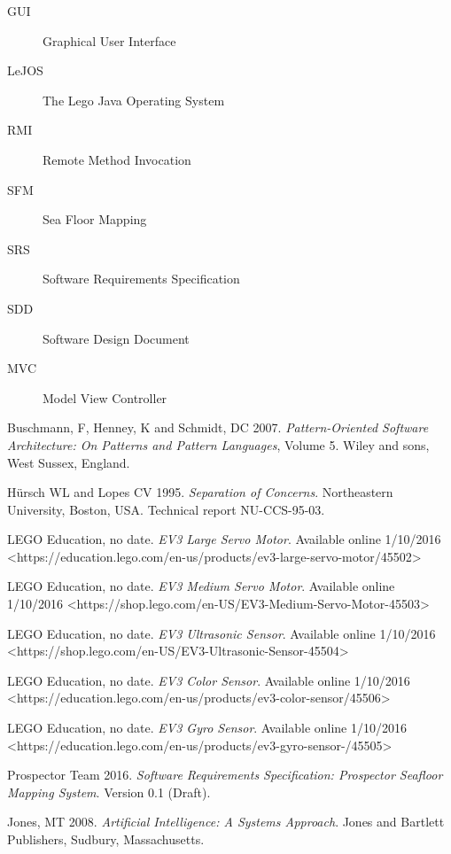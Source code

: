 \documentclass[12pt]{article}
\begin{document}
\begin{description}
\item [{GUI}] Graphical User Interface 
\item [{LeJOS}] The Lego Java Operating System 
\item [{RMI}] Remote Method Invocation 
\item [{SFM}] Sea Floor Mapping 
\item [{SRS}] Software Requirements Specification 
\item [{SDD}] Software Design Document 
\item[{MVC}] Model View Controller

\end{description}



\begin{thebibliography}{1}

 Buschmann, F, Henney, K and Schmidt, DC 2007. \textit{Pattern-Oriented Software Architecture: On Patterns and Pattern Languages}, Volume 5. Wiley and sons, West Sussex, England.

 Hürsch WL and Lopes CV 1995. \textit{Separation of Concerns}. Northeastern University, Boston, USA. Technical report NU-CCS-95-03.

 LEGO Education, no date. \textit{EV3 Large Servo Motor}. Available online 1/10/2016 <https://education.lego.com/en-us/products/ev3-large-servo-motor/45502>

 LEGO Education, no date. \textit{EV3 Medium Servo Motor}. Available online 1/10/2016 <https://shop.lego.com/en-US/EV3-Medium-Servo-Motor-45503>

 LEGO Education, no date. \textit{EV3 Ultrasonic Sensor}. Available online 1/10/2016 <https://shop.lego.com/en-US/EV3-Ultrasonic-Sensor-45504>

 LEGO Education, no date. \textit{EV3 Color Sensor}. Available online 1/10/2016 <https://education.lego.com/en-us/products/ev3-color-sensor/45506>

 LEGO Education, no date. \textit{EV3 Gyro Sensor}. Available online 1/10/2016 <https://education.lego.com/en-us/products/ev3-gyro-sensor-/45505>

 Prospector Team 2016. \textit{Software Requirements Specification: Prospector Seafloor Mapping System}. Version 0.1 (Draft).

Jones, MT 2008. \textit{Artificial Intelligence: A Systems Approach}. Jones and Bartlett Publishers, Sudbury, Massachusetts.
   
      

  \end{thebibliography}
\end{document}
